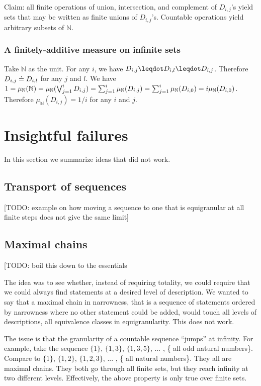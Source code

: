 \documentclass[10pt, onecolumn, longbibliography, nofootinbib]{revtex4-2}
\begin{document}
Claim: all finite operations of union, intersection, and complement of $D_{i,j}$'s yield sets that may be written as finite unions of $D_{i,j}$'s. Countable operations yield arbitrary subsets of $\mathbb{N}$. 

\subsubsection{A finitely-additive measure on infinite sets}

Take $\mathbb{N}$ as the unit. For any $i$, we have $D_{i,j} \finer D_{i,l} \finer D_{i,j}$. Therefore $D_{i,j} \doteq D_{i,l}$ for any $j$ and $l$. We have $1 = \mu_{\mathbb{N}}(\mathbb{N}) = \mu_{\mathbb{N}}(\bigvee_{j=1}^i D_{i,j}) = \sum_{j=1}^i \mu_{\mathbb{N}}( D_{i,j}) = \sum_{j=1}^i \mu_{\mathbb{N}}( D_{i,0}) = i \mu_{\mathbb{N}}( D_{i,0}) $. Therefore $\mu_{\mathbb{N}}( D_{i,j}) = 1/i$ for any $i$ and $j$.

\section{Insightful failures}

In this section we summarize ideas that did not work.

\subsection{Transport of sequences}

[TODO: example on how moving a sequence to one that is equigranular at all finite steps does not give the same limit]

\subsection{Maximal chains}
[TODO: boil this down to the essentials

The idea was to see whether, instead of requiring totality, we could require that we could always find statements at a desired level of description. We wanted to say that a maximal chain in narrowness, that is a sequence of statements ordered by narrowness where no other statement could be added, would touch all levels of descriptions, all equivalence classes in equigranularity. This does not work.

The issue is that the granularity of a countable sequence ``jumps'' at infinity. For example, take the sequence $\{1\}$, $\{1, 3\}$, $\{1, 3, 5\}$, ... , \{ all odd natural numbers\}. Compare to $\{1\}$, $\{1, 2\}$, $\{1, 2, 3\}$, ... , \{ all natural numbers\}. They all are maximal chains. They both go through all finite sets, but they reach infinity at two different levels. Effectively, the above property is only true over finite sets.
\end{document}
